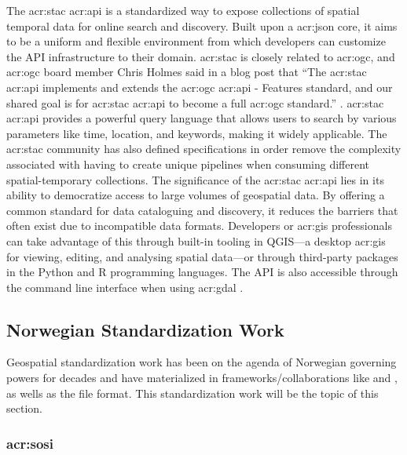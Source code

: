 The \gls{acr:stac} \acrshort{acr:api} is a standardized way to expose collections of spatial temporal data for online search and discovery. Built upon a \acrshort{acr:json} core, it aims to be a uniform and flexible environment from which developers can customize the API infrastructure to their domain. \acrshort{acr:stac} is closely related to \acrshort{acr:ogc}, and \acrshort{acr:ogc} board member Chris Holmes said in a blog post that \enquote{The \acrshort{acr:stac} \acrshort{acr:api} implements and extends the \gls{acr:ogc} \acrshort{acr:api} - Features standard, and our shared goal is for \gls{acr:stac} \acrshort{acr:api} to become a full \gls{acr:ogc} standard.} \citep{holmesSpatioTemporalAssetCatalogs2021}. \gls{acr:stac} \acrshort{acr:api} provides a powerful query language that allows users to search by various parameters like time, location, and keywords, making it widely applicable. The \acrshort{acr:stac} community has also defined specifications in order remove the complexity associated with having to create unique pipelines when consuming different spatial-temporary collections. The significance of the \gls{acr:stac} \acrshort{acr:api} lies in its ability to democratize access to large volumes of geospatial data. By offering a common standard for data cataloguing and discovery, it reduces the barriers that often exist due to incompatible data formats. Developers or \acrshort{acr:gis} professionals can take advantage of this through built-in tooling in QGIS---a desktop \gls{acr:gis} for viewing, editing, and analysing spatial data---or through third-party packages in the Python and R programming languages. The API is also accessible through the command line interface when using \acrshort{acr:gdal} \citep{STACTutorials}.

\subsection{Norwegian Standardization Work}\label{subsec:standardization-norway}

Geospatial standardization work has been on the agenda of Norwegian governing powers for decades and have materialized in frameworks/collaborations like  and , as wells as the  file format. This standardization work will be the topic of this section.

\subsubsection[SOSI]{\acrshort{acr:sosi}}\label{subsubsec:sosi}

